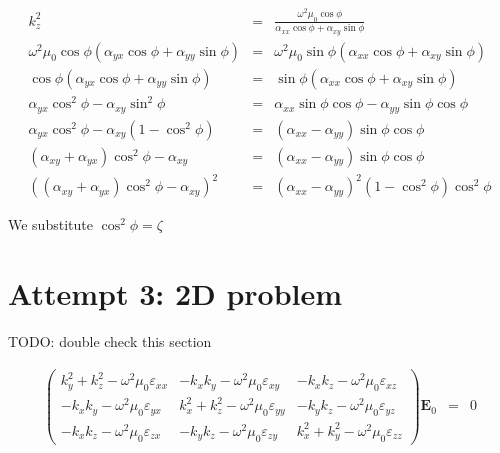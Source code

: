 \documentclass[12pt,a4paper,twoside,openright,BCOR10mm,headsepline,titlepage,abstracton,chapterprefix,final]{scrreprt}
\newcommand\Vector[1]{{\mathbf{#1}}}
\newcommand\vacuum{0}
\newcommand\wavenumber{k}
\newcommand\scalarEfield{E}
\newcommand\Efield{\Vector{\scalarEfield}}
\newcommand\vacuumpermeability{\scalarpermeability_{\vacuum}}
\newcommand\scalarpermeability{\mu}
\newcommand\scalarpermittivity{\varepsilon}
\begin{document}
\begin{eqnarray}
 \wavenumber_z^2 &=& \frac{ \omega^2 \mu_0 \cos \phi}{\alpha_{xx} \cos \phi + \alpha_{xy} \sin \phi}\\ 
 \omega^2 \mu_0 \cos \phi (\alpha_{yx} \cos \phi + \alpha_{yy} \sin \phi) &=& \omega^2 \mu_0 \sin \phi (\alpha_{xx} \cos \phi + \alpha_{xy} \sin \phi) \\
 \cos \phi (\alpha_{yx} \cos \phi + \alpha_{yy} \sin \phi) &=& \sin \phi (\alpha_{xx} \cos \phi + \alpha_{xy} \sin \phi) \\
 \alpha_{yx} \cos^2 \phi - \alpha_{xy} \sin^2 \phi &=& \alpha_{xx} \sin \phi \cos \phi - \alpha_{yy} \sin \phi \cos \phi \\
 \alpha_{yx} \cos^2 \phi - \alpha_{xy} ( 1- \cos^2 \phi ) &=& ( \alpha_{xx} - \alpha_{yy} ) \sin \phi \cos \phi \\
 ( \alpha_{xy} + \alpha_{yx} ) \cos^2 \phi - \alpha_{xy} &=& ( \alpha_{xx} - \alpha_{yy} ) \sin \phi \cos \phi \\
 \left( ( \alpha_{xy} + \alpha_{yx} ) \cos^2 \phi - \alpha_{xy}\right)^2 &=& ( \alpha_{xx} - \alpha_{yy} )^2 (1- \cos^2 \phi) \cos^2 \phi
\end{eqnarray}

We substitute $\cos^2 \phi = \zeta$





\section{Attempt 3: 2D problem}
TODO: double check this section

\begin{eqnarray}
\begin{pmatrix}
 \wavenumber_y^2 + \wavenumber_z^2 - \omega^2 \vacuumpermeability \scalarpermittivity_{xx} 
 &
 - \wavenumber_x \wavenumber_y - \omega^2 \vacuumpermeability \scalarpermittivity_{xy}
 &
 - \wavenumber_x \wavenumber_z - \omega^2 \vacuumpermeability \scalarpermittivity_{xz}
 \\
 - \wavenumber_x \wavenumber_y - \omega^2 \vacuumpermeability \scalarpermittivity_{yx}
 &
 \wavenumber_x^2 + \wavenumber_z^2 - \omega^2 \vacuumpermeability \scalarpermittivity_{yy} 
 &
 - \wavenumber_y \wavenumber_z - \omega^2 \vacuumpermeability \scalarpermittivity_{yz}
 \\
 - \wavenumber_x \wavenumber_z - \omega^2 \vacuumpermeability \scalarpermittivity_{zx}
 &
 - \wavenumber_y \wavenumber_z - \omega^2 \vacuumpermeability \scalarpermittivity_{zy}
 &
 \wavenumber_x^2 + \wavenumber_y^2 - \omega^2 \vacuumpermeability \scalarpermittivity_{zz}  
\end{pmatrix}
\Efield_0
&=& 0 \label{eq:generalDispersionEigenEquation}
\end{eqnarray}
\end{document}
